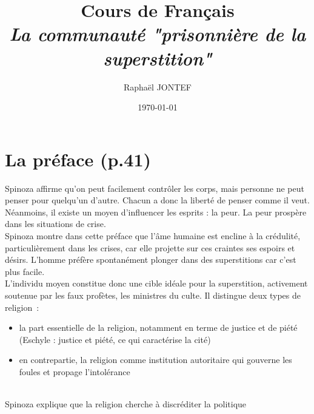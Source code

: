 \documentclass[a4paper,12pt]{article}
\title{Cours de Français\\ \Large \textit{La communauté "prisonnière de la superstition"}}
\author{Raphaël JONTEF}
\date{\today}
\begin{document}
\section{La préface (p.41)}
Spinoza affirme qu'on peut facilement contrôler les corps, mais personne ne peut penser pour quelqu'un d'autre. Chacun a donc la liberté de penser comme il veut. Néanmoins, il existe un moyen d'influencer les esprits : la peur. La peur prospère dans les situations de crise.\\

Spinoza montre dans cette préface que l'âme humaine est encline à la crédulité, particulièrement dans les crises, car elle projette sur ces craintes ses espoirs et désirs. L'homme préfère spontanément plonger dans des superstitions car c'est plus facile. \\L'individu moyen constitue donc une cible idéale pour la superstition, activement soutenue par les faux profètes, les ministres du culte. Il distingue deux types de religion~:
\begin{itemize}
    \item la part essentielle de la religion, notamment en terme de justice et de piété (Eschyle : justice et piété, ce qui caractérise la cité)
    \item en contrepartie, la religion comme institution autoritaire qui gouverne les foules et propage l'intolérance 
\end{itemize}\\
Spinoza explique que la religion cherche à discréditer la politique
\end{document}
